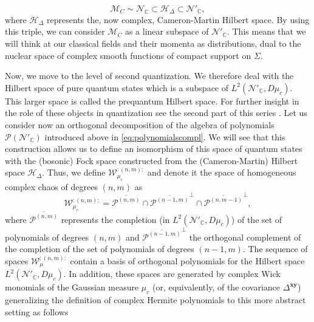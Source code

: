 \documentclass{elsarticle}%
\begin{document}
\begin{equation}
\label{eq:complexgelfand}
\mathcal{M}_C\sim \mathcal{N}_\mathbb{C}\subset \mathcal{H}_\Delta\subset \mathcal{N}'_\mathbb{C},
\end{equation}
 where $\mathcal{H}_\Delta$ represents the, now complex, Cameron-Martin Hilbert space. By using this triple, we can consider $\mathcal{M}_C$ as a linear subspace of $\mathcal{N}'_\mathbb{C}$. This means that we will think at our classical fields and their momenta as distributions, dual to the nuclear space of complex smooth functions of compact support on $\Sigma$.

Now, we move to the level of second quantization. We therefore deal with the Hilbert space of pure quantum states which is  a subspace of $L^2(\mathcal{N}'_\mathbb{C}, D\mu_c)$. This  larger space is called the prequantum Hilbert space. For further insight in the role of these objects in quantization see the second part of this series \cite{alonsoGeometricFlavours2024}.   Let us consider now an orthogonal decomposition of the algebra of polynomials $\mathcal{P}(\mathcal{N}'_{\mathbb{C}})$ introduced above in  \eqref{eq:polynomialscompl}. We will see that this construction allows us to define an isomorphism of this space of quantum states with the (bosonic) Fock space constructed from the  (Cameron-Martin) Hilbert space $\mathcal{H}_\Delta$. Thus, we define  $\mathcal{W}_{\mu_c}^{:(n,m):}$ and denote it the space of homogeneous complex chaos of degrees $(n,m)$ as
\begin{equation}
\label{eq:wickspaces}
\mathcal{W}_{\mu_c}^{:(n,m):}=\overline{\mathcal{P}^{(n,m)}}\cap \overline{\mathcal{P}^{{(n-1,m)}}}^\perp\cap \overline{\mathcal{P}^{{(n,m-1)}}}^\perp,
\end{equation}
where $\overline{\mathcal{P}^{(n,m)}}$ represents the completion (in $L^2(\mathcal{N}'_\mathbb{C}, D\mu_c)$) of the set of polynomials of degrees $(n,m)$  and $\overline{\mathcal{P}^{(n-1,m)}}^\perp$ the orthogonal complement of the completion of the set of polynomials of degrees $(n-1,m)$. The sequence of spaces  $\mathcal{W}_\mu^{:(n,m):}$  contain a basis of orthogonal polynomials for the Hilbert space $L^2(\mathcal{N}'_\mathbb{C}, D\mu_c)$. In addition, these spaces are   generated by complex Wick monomials of the Gaussian measure $\mu_c$ (or, equivalently, of the covariance $\Delta^{\mathbf{xy}}$)   generalizing the definition of complex Hermite polynomials to this more abstract setting \cite{hidaBrownianMotion1980} as follows
\end{document}
